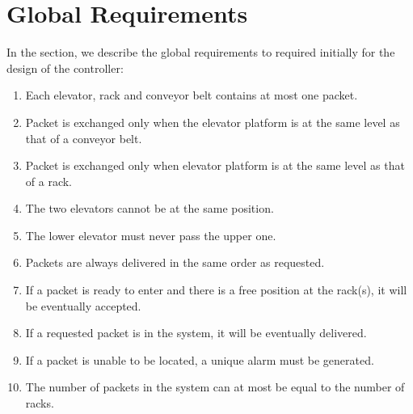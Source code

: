 \section*{Global Requirements}
\label{sec:global_req}
In the section, we describe the global requirements to required initially for the design of the controller:
\begin{enumerate}
\item Each elevator, rack and conveyor belt contains at most one packet.
\item Packet is exchanged only when the elevator platform is at the same level as that of a conveyor belt.
\item Packet is exchanged only when elevator platform is at the same level as that of a rack.
\item The two elevators cannot be at the same position.
\item The lower elevator must never pass the upper one.
\item Packets are always delivered in the same order as requested.
\item If a packet is ready to enter and there is a free position at the rack(s), it will be eventually accepted.
\item If a requested packet is in the system, it will be eventually delivered. %
\item If a packet is unable to be located, a unique alarm must be generated.
\item The number of packets in the system can at most be equal to the number of racks.
 



\end{enumerate}